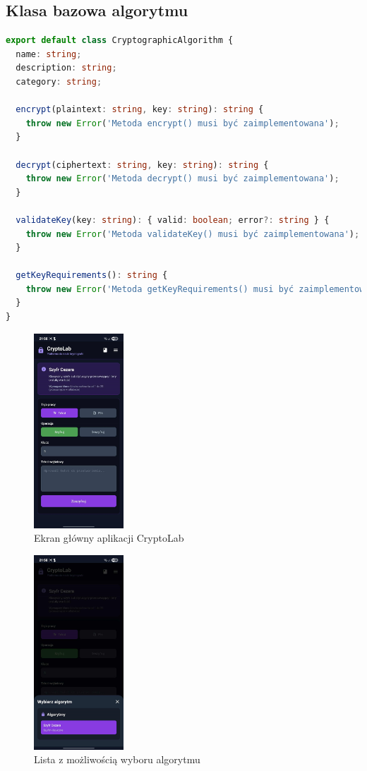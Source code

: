 \documentclass[12pt,a4paper]{article}
\begin{document}
\subsection{Klasa bazowa algorytmu}
\begin{lstlisting}[language=TypeScript, caption={Klasa abstrakcyjna CryptographicAlgorithm}]
export default class CryptographicAlgorithm {
  name: string;
  description: string;
  category: string;

  encrypt(plaintext: string, key: string): string {
    throw new Error('Metoda encrypt() musi być zaimplementowana');
  }

  decrypt(ciphertext: string, key: string): string {
    throw new Error('Metoda decrypt() musi być zaimplementowana');
  }

  validateKey(key: string): { valid: boolean; error?: string } {
    throw new Error('Metoda validateKey() musi być zaimplementowana');
  }

  getKeyRequirements(): string {
    throw new Error('Metoda getKeyRequirements() musi być zaimplementowana');
  }
}
\end{lstlisting}
\begin{figure}[H]
    \centering
    \includegraphics[width=0.3\textwidth]{img/szyfr_cezara.jpg}
    \caption{Ekran główny aplikacji CryptoLab}
\end{figure}
\begin{figure}[H]
    \centering
    \includegraphics[width=0.3\textwidth]{img/lista_wyboru.jpg}
    \caption{Lista z możliwością wyboru algorytmu}
\end{figure}
\end{document}
